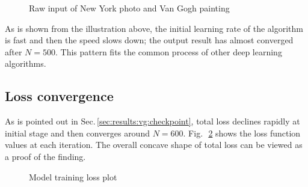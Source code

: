     \begin{figure}[!hbt]
    \center
    \caption{Raw input of New York photo and Van Gogh painting}
    \label{fig:results:vg:checkpoint}
    \end{figure}

As is shown from the illustration above, the initial learning rate of the algorithm is fast
and then the speed slows down; the output result has almost converged after $N=500$.
This pattern fits the common process of other deep learning algorithms.

\newpage
\subsection{Loss convergence}
As is pointed out in Sec.\,\ref{sec:results:vg:checkpoint},
total loss declines rapidly at initial stage and then converges around $N = 600$.
Fig.\,~\ref{fig:results:vg:loss} shows the loss function values at each iteration.
The overall concave shape of total loss can be viewed as a proof of the finding.

    \begin{figure}[!hbt]
    \center
    \caption{Model training loss plot}
    \label{fig:results:vg:loss}
    \end{figure}

